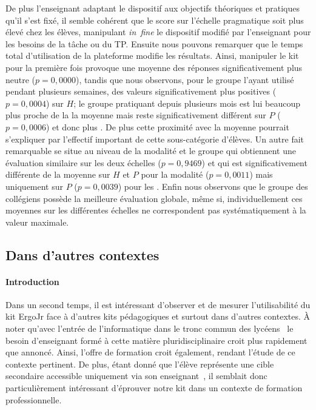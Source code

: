         De plus l'enseignant adaptant le dispositif aux objectifs théoriques et pratiques qu'il s'est fixé, il semble cohérent que le score sur l'échelle pragmatique soit plus élevé chez les élèves, manipulant \textit{in~fine} le dispositif modifié par l'enseignant pour les besoins de la tâche ou du TP.
        Ensuite nous pouvons remarquer que le temps total d'utilisation de la plateforme modifie les résultats.
        Ainsi, manipuler le kit pour la première fois provoque une moyenne des réponses significativement plus neutre ($p=0,0000$), tandis que nous observons, pour le groupe l'ayant utilisé pendant plusieurs semaines, des valeurs significativement plus positives ($p=0,0004$) sur $H$;
        le groupe pratiquant depuis plusieurs mois est lui beaucoup plus proche de la la moyenne mais reste significativement différent sur $P$ ($p=0,0006$) et donc plus .
        De plus cette proximité avec la moyenne pourrait s'expliquer par l'effectif important de cette sous-catégorie d'élèves.
        Un autre fait remarquable se situe au niveau de la modalité  et le groupe  qui obtiennent une évaluation similaire sur les deux échelles ($p=0,9469$) et qui est significativement différente de la moyenne sur $H$ et $P$ pour la modalité  ($p=0,0011$) mais uniquement sur $P$ ($p=0,0039$) pour les .
        Enfin nous observons que le groupe des collégiens possède la meilleure évaluation globale, même si, individuellement ces moyennes sur les différentes échelles ne correspondent pas systématiquement à la valeur maximale.
    \subsection{Dans d'autres contextes}\label{Exp:vs_thymio}
        \paragraph{Introduction}
            Dans un second temps, il est intéressant d'observer et de mesurer l'utilisabilité du kit ErgoJr face à d'autres kits pédagogiques et surtout dans d'autres contextes. À noter qu'avec l'entrée de l'informatique dans le tronc commun des lycéens~ le besoin d'enseignant formé à cette matière pluridisciplinaire croit plus rapidement que annoncé. Ainsi, l'offre de formation  croit également, rendant l'étude de ce contexte pertinent. De plus, étant donné que l'élève représente une cible secondaire accessible uniquement via son enseignant~, il semblait donc particulièrement intéressant d'éprouver notre kit dans un contexte de formation professionnelle.
